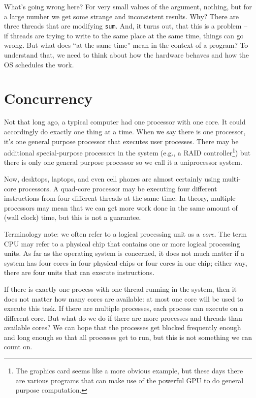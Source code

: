 \documentclass[a4paper]{report}
\begin{document}
What's going wrong here? For very small values of the argument, nothing, but for a large number we get some strange and inconsistent results. Why? There are three threads that are modifying \texttt{sum}. And, it turns out, that this is a problem -- if threads are trying to write to the same place at the same time, things can go wrong. But what does ``at the same time'' mean in the context of a program? To understand that, we need to think about how the hardware behaves and how the OS schedules the work.

\section*{Concurrency}

Not that long ago, a typical computer had one processor with one core. It could accordingly do exactly one thing at a time. When we say there is one processor, it's one general purpose processor that executes user processes. There may be additional special-purpose processors in the system (e.g., a RAID controller\footnote{The graphics card seems like a more obvious example, but these days there are various programs that can make use of the powerful GPU to do general purpose computation.}) but there is only one general purpose processor so we call it a uniprocessor system.

Now, desktops, laptops, and even cell phones are almost certainly using multi-core processors. A quad-core processor may be executing four different instructions from four different threads at the same time. In theory, multiple processors may mean that we can get more work done in the same amount of (wall clock) time, but this is not a guarantee.

Terminology note: we often refer to a logical processing unit as a \textit{core}. The term CPU may refer to a physical chip that contains one or more logical processing units. As far as the operating system is concerned, it does not much matter if a system has four cores in four physical chips or four cores in one chip; either way, there are four units that can execute instructions.

If there is exactly one process with one thread running in the system, then it does not matter how many cores are available: at most one core will be used to execute this task. If there are multiple processes, each process can execute on a different core. But what do we do if there are more processes and threads than available cores? We can hope that the processes get blocked frequently enough and long enough so that all processes get to run, but this is not something we can count on.
\end{document}
